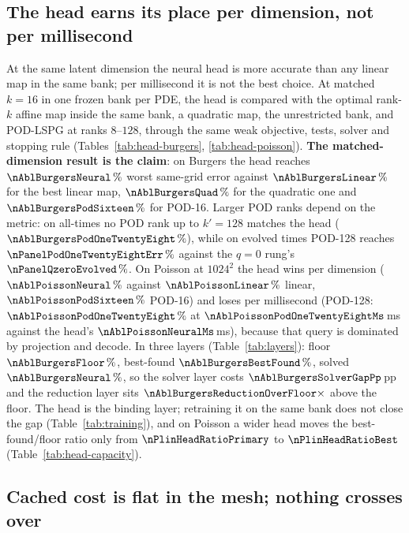 \subsection{The head earns its place per dimension, not per millisecond}
\label{sec:exp:head}

At the same latent dimension the neural head is more accurate than any linear
map in the same bank; per millisecond it is not the best choice. At matched
$k=16$ in one frozen bank per PDE, the head is compared with the optimal
rank-$k$ affine map inside the same bank, a quadratic map, the
unrestricted bank, and POD-LSPG at ranks $8$--$128$, through the same weak
objective, tests, solver and stopping rule (Tables~\ref{tab:head-burgers},
\ref{tab:head-poisson}). \textbf{The matched-dimension result is the claim}: on
Burgers the head reaches $\nAblBurgersNeural\,\%$ worst same-grid error against
$\nAblBurgersLinear\,\%$ for the best linear map, $\nAblBurgersQuad\,\%$ for
the quadratic one and $\nAblBurgersPodSixteen\,\%$ for POD-16. Larger POD ranks depend on the metric: on all-times no POD rank up to $k'=128$
matches the head ($\nAblBurgersPodOneTwentyEight\,\%$), while on evolved times
POD-128 reaches $\nPanelPodOneTwentyEightErr\,\%$ against the $q=0$ rung's
$\nPanelQzeroEvolved\,\%$. On
Poisson at $1024^2$ the head wins per dimension ($\nAblPoissonNeural\,\%$
against $\nAblPoissonLinear\,\%$ linear, $\nAblPoissonPodSixteen\,\%$ POD-16)
and loses per millisecond (POD-128: $\nAblPoissonPodOneTwentyEight\,\%$ at
$\nAblPoissonPodOneTwentyEightMs$\,ms against the head's
$\nAblPoissonNeuralMs$\,ms), because that query is dominated by projection and
decode. In three layers (Table~\ref{tab:layers}): floor $\nAblBurgersFloor\,\%$,
best-found $\nAblBurgersBestFound\,\%$, solved $\nAblBurgersNeural\,\%$, so the
solver layer costs $\nAblBurgersSolverGapPp$\,pp and the reduction layer sits
$\nAblBurgersReductionOverFloor\times$ above the floor. The head is the binding layer; retraining it on the same bank does not
close the gap (Table~\ref{tab:training}), and on Poisson a wider head moves the
best-found/floor ratio only from $\nPlinHeadRatioPrimary$ to
$\nPlinHeadRatioBest$ (Table~\ref{tab:head-capacity}).

\subsection{Cached cost is flat in the mesh; nothing crosses over}
\label{sec:exp:mesh}

